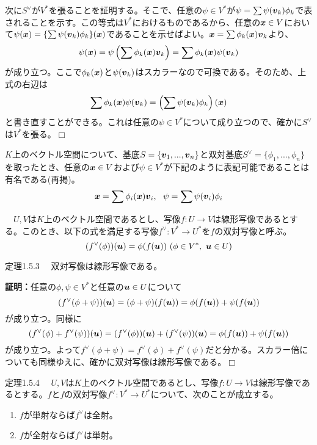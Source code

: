 \documentclass[dvipdfmx, 9pt, a4paper]{jsarticle}
\numberwithin{equation}{subsection}
\newcommand{\bm}[1]{{\mbox{\boldmath $#1$}}}
\def\qed{\hfill $\Box$}
\begin{document}
次に$S^\vee$が$V^*$を張ることを証明する。そこで、任意の$\psi \in V^*$が$\psi=\sum \psi(\bm v_k)\phi_k$で表されることを示す。この等式は$V^*$におけるものであるから、任意の$\bm x \in V$において$\psi(\bm x)=\{ \sum \psi(\bm v_k)\phi_k\}(\bm x)$であることを示せばよい。$\bm x=\sum \phi_k(\bm x)\bm v_k$より、
\begin{equation}
\psi(\bm x)=\psi \left( \sum \phi_k(\bm x)\bm v_k \right)=\sum \phi_k(\bm x)\psi(\bm v_k) \notag
\end{equation}
が成り立つ。ここで$\phi_k(\bm x)$と$\psi(\bm v_k)$はスカラーなので可換である。そのため、上式の右辺は
\begin{equation}
\sum \phi_k(\bm x)\psi(\bm v_k)=\left(\sum \psi(\bm v_k)\phi_k \right)(\bm x) \notag
\end{equation}
と書き直すことができる。これは任意の$\psi \in V^*$について成り立つので、確かに$S^\vee$は$V^*$を張る。\qed \par
$K$上のベクトル空間について、基底$S=\{ \bm v_1, ..., \bm v_n \}$と双対基底$S^\vee=\{\phi_1, ..., \phi_n \}$を取ったとき、任意の$\bm x \in V$および$\psi \in V^*$が下記のように表記可能であることは有名である(再掲)。
\begin{equation}
\bm x=\sum \phi_i(\bm x)\bm v_i,~~\psi=\sum \psi(\bm v_i)\phi_i
\end{equation}
\begin{tcolorbox}[title=双対写像]
　$U, V$は$K$上のベクトル空間であるとし、写像$f:U \to V$は線形写像であるとする。このとき、以下の式を満足する写像$f^\vee: V^* \to U^*$を$f$の双対写像と呼ぶ。
\begin{equation}
(f^\vee(\phi))(\bm u)=\phi(f(\bm u))~(\phi \in V^*,~\bm u \in U) \notag
\end{equation}
\end{tcolorbox}
\begin{itembox}[l]{定理1.5.3}
　双対写像は線形写像である。
\end{itembox}
{\bf 証明：}任意の$\phi, \psi \in V^*$と任意の$\bm u \in U$について
\begin{equation}
(f^\vee(\phi+\psi))(\bm u)=(\phi+\psi)(f(\bm u))=\phi(f(\bm u))+\psi(f(\bm u)) \notag
\end{equation}
が成り立つ。同様に
\begin{equation}
(f^\vee(\phi)+f^\vee(\psi))(\bm u)=(f^\vee(\phi))(\bm u)+(f^\vee(\psi))(\bm u)=\phi(f(\bm u))+\psi(f(\bm u)) \notag
\end{equation}
が成り立つ。よって$f^\vee(\phi+\psi)=f^\vee(\phi)+f^\vee(\psi)$だと分かる。スカラー倍についても同様ゆえに、確かに双対写像は線形写像である。\qed
\begin{itembox}[l]{定理1.5.4}
　$U, V$は$K$上のベクトル空間であるとし、写像$f:U \to V$は線形写像であるとする。$f$と$f$の双対写像$f^\vee:V^* \to U^*$について、次のことが成立する。
\begin{enumerate}
\item $f$が単射ならば$f^\vee$は全射。
\item $f$が全射ならば$f^\vee$は単射。
\end{enumerate}
\end{itembox}
\end{document}
